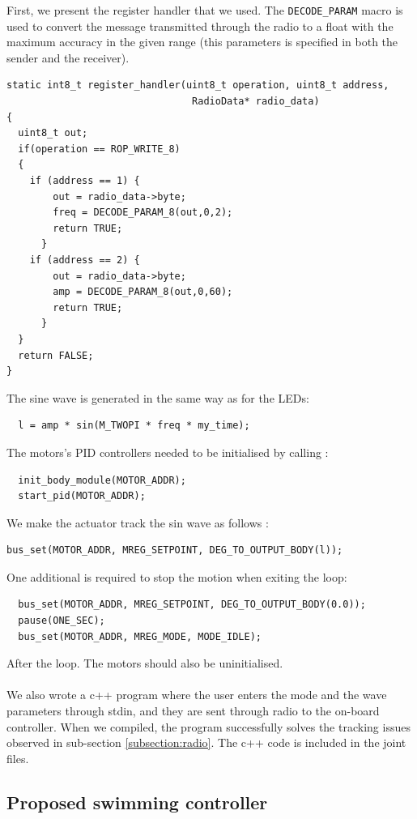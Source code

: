 \documentclass[11pt]{article}
\begin{document}
First, we present the register handler that we used. The \texttt{DECODE\_PARAM} macro is used to convert the message transmitted through the radio to a float with the maximum accuracy in the given range (this parameters is specified in both the sender and the receiver).
\begin{verbatim}
static int8_t register_handler(uint8_t operation, uint8_t address,
                                RadioData* radio_data)
{
  uint8_t out;
  if(operation == ROP_WRITE_8)
  {
    if (address == 1) {
        out = radio_data->byte;
        freq = DECODE_PARAM_8(out,0,2);
        return TRUE;
      }
    if (address == 2) {
        out = radio_data->byte;
        amp = DECODE_PARAM_8(out,0,60);
        return TRUE;
      }
  }
  return FALSE;
}
\end{verbatim}
The sine wave is generated in the same way as for the LEDs: 
\begin{verbatim}
  l = amp * sin(M_TWOPI * freq * my_time);
\end{verbatim}
The motors's PID controllers needed to be initialised by calling  :
\begin{verbatim}
  init_body_module(MOTOR_ADDR);
  start_pid(MOTOR_ADDR);
\end{verbatim}
We make the actuator track the sin wave as follows :
\begin{verbatim}
bus_set(MOTOR_ADDR, MREG_SETPOINT, DEG_TO_OUTPUT_BODY(l));
\end{verbatim}
One additional is required to stop the motion when exiting the loop:
\begin{verbatim}
  bus_set(MOTOR_ADDR, MREG_SETPOINT, DEG_TO_OUTPUT_BODY(0.0));
  pause(ONE_SEC);
  bus_set(MOTOR_ADDR, MREG_MODE, MODE_IDLE);
\end{verbatim}
After the loop. The motors should also be uninitialised. 
\\ \\
We also wrote a c++ program where the user enters the mode and the wave parameters through stdin, and they are sent through radio to the on-board controller. When we compiled, the program successfully solves the tracking issues observed in sub-section \ref{subsection:radio}.
The c++ code is included in the joint files.

\subsection{Proposed swimming controller}
\end{document}
